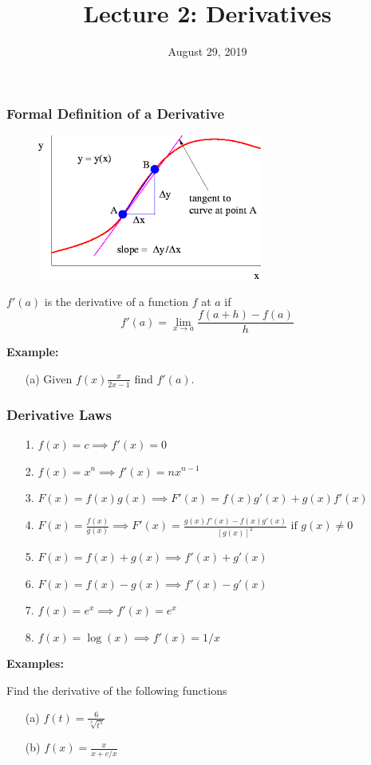 \documentclass{beamer}
\title{\textbf{Lecture 2: Derivatives}}
\date{August 29, 2019}
\begin{document}
	
\frame{\titlepage}

\begin{frame}
\frametitle{\textbf{Formal Definition of a Derivative}}

\begin{figure}
	\centering
	\includegraphics[height=.4\textheight]{derivative-definition.png}\\
	\hspace*{10pt}\hbox{}
\end{figure}

$f'(a)$ is the derivative of a function $f$ at $a$ if
$$f'(a) = \lim\limits_{x\to a} \frac{f(a+h)-f(a)}{h}$$

\vspace{6pt}

\textbf{Example:}
\begin{itemize}
	\item[(a)] Given $f(x)\frac{x}{2x-1}$ find $f'(a)$.
\end{itemize}
\end{frame}


\begin{frame}
\frametitle{\textbf{Derivative Laws}}
\begin{itemize}
	\item[1.] $f(x)=c \implies f'(x) = 0$
	\item[2.] $f(x) = x^n \implies f'(x) = nx^{n-1}$
	\item[3.] $F(x) = f(x)g(x) \implies F'(x)=f(x)g'(x) + g(x)f'(x)$
	\item[4.] $F(x) = \frac{f(x)}{g(x)} \implies F'(x)= \frac{g(x)f'(x)-f(x)g'(x)}{[g(x)]^2} \mbox{ if } g(x) \neq 0$
	\item[5.] $F(x) = f(x) + g(x) \implies f'(x) + g'(x)$
	\item[6.] $F(x)  = f(x) - g(x) \implies f'(x) - g'(x)$
	\item[7.] $f(x) = e^x \implies f'(x) = e^x$
	\item[8.] $f(x) = \log(x) \implies f'(x) = 1/x$
\end{itemize}

\vspace{6pt}

\textbf{Examples:}

Find the derivative of the following functions
\begin{itemize}
	\item[(a)] $f(t)=\frac{6}{\sqrt[3]{t^5}}$
	\item[(b)] $f(x)=\frac{x}{x+c/x}$
\end{itemize}
\end{frame}
\end{document}
